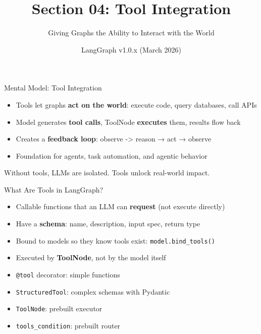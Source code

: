 \documentclass[aspectratio=169,11pt]{beamer}
\title{Section 04: Tool Integration}
\subtitle{Giving Graphs the Ability to Interact with the World}
\author{LangGraph v1.0.x (March 2026)}
\date{}
\begin{document}
\frame{\titlepage}

\begin{frame}{Mental Model: Tool Integration}
  \begin{conceptbox}
    \setlength{\itemsep}{1pt}
    \begin{itemize}
      \item Tools let graphs \textbf{act on the world}: execute code, query databases, call APIs
      \item Model generates \textbf{tool calls}, ToolNode \textbf{executes} them, results flow back
      \item Creates a \textbf{feedback loop}: observe -> reason → act → observe
      \item Foundation for agents, task automation, and agentic behavior
    \end{itemize}
  \end{conceptbox}
  \vspace{0.1cm}
  \begin{tipbox}
    Without tools, LLMs are isolated. Tools unlock real-world impact.
  \end{tipbox}
\end{frame}

\begin{frame}{What Are Tools in LangGraph?}
  \begin{conceptbox}
    \setlength{\itemsep}{1pt}
    \begin{itemize}
      \item Callable functions that an LLM can \textbf{request} (not execute directly)
      \item Have a \textbf{schema}: name, description, input spec, return type
      \item Bound to models so they know tools exist: \texttt{model.bind\_tools()}
      \item Executed by \textbf{ToolNode}, not by the model itself
    \end{itemize}
  \end{conceptbox}
  \vspace{0.1cm}
  \begin{codebox}
    \setlength{\itemsep}{1pt}
    \begin{itemize}
      \item \texttt{@tool} decorator: simple functions
      \item \texttt{StructuredTool}: complex schemas with Pydantic
      \item \texttt{ToolNode}: prebuilt executor
      \item \texttt{tools\_condition}: prebuilt router
    \end{itemize}
  \end{codebox}
\end{frame}
\end{document}

